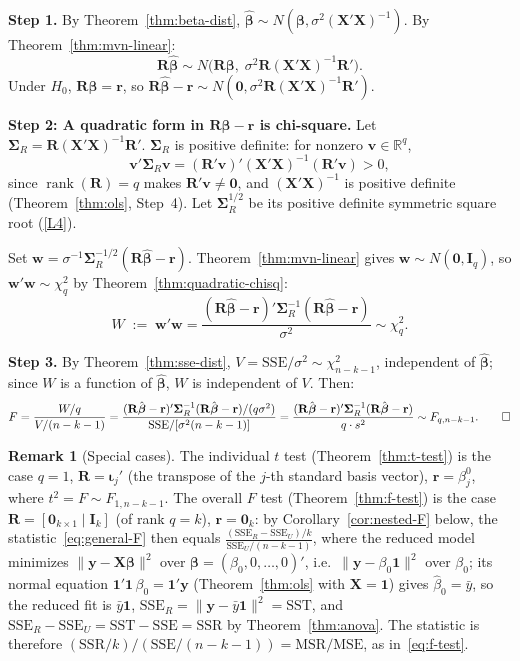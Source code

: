 \documentclass[12pt,a4paper]{article}
\makeatletter
\theoremstyle{definition}
\newtheorem{remark}[theorem]{Remark}
\renewenvironment{proof}[1][\proofname]{\par
  \pushQED{\qed}%
  \normalfont \topsep6\p@\@plus6\p@\relax
  \trivlist
  \item[\hskip\labelsep\bfseries #1\@addpunct{.}]\ignorespaces
}{%
  \popQED\endtrivlist\@endpefalse
}
\DeclareMathOperator\rank{rank}
\newcommand{\SST}{\mathrm{SST}}
\newcommand{\SSR}{\mathrm{SSR}}
\newcommand{\SSE}{\mathrm{SSE}}
\newcommand{\MSR}{\mathrm{MSR}}
\newcommand{\MSE}{\mathrm{MSE}}
\newcommand{\bX}{\mathbf{X}}
\newcommand{\by}{\mathbf{y}}
\def\bb{\boldsymbol{\beta}}
\newcommand{\bI}{\mathbf{I}}
\newcommand{\bR}{\mathbf{R}}
\newcommand{\br}{\mathbf{r}}
\newcommand{\bone}{\mathbf{1}}
\newcommand{\bzero}{\mathbf{0}}
\newcommand{\bw}{\mathbf{w}}
\newcommand{\bv}{\mathbf{v}}
\newcommand{\Real}{\mathbb{R}}
\makeatother
\begin{document}
\begin{proof}
\textbf{Step 1.} By Theorem~\ref{thm:beta-dist}, $\hat{\bb} \sim N(\bb, \sigma^2(\bX'\bX)^{-1})$. By Theorem~\ref{thm:mvn-linear}:
\[
\bR\hat{\bb} \sim N\!\bigl(\bR\bb,\; \sigma^2\bR(\bX'\bX)^{-1}\bR'\bigr).
\]
Under $H_0$, $\bR\bb = \br$, so $\bR\hat{\bb} - \br \sim N(\bzero, \sigma^2\bR(\bX'\bX)^{-1}\bR')$.

\textbf{Step 2: A quadratic form in $\bR\hat{\bb} - \br$ is chi-square.} Let $\boldsymbol\Sigma_R = \bR(\bX'\bX)^{-1}\bR'$. $\boldsymbol\Sigma_R$ is positive definite: for nonzero $\bv \in \Real^q$,
\[
\bv'\boldsymbol\Sigma_R\bv = (\bR'\bv)'(\bX'\bX)^{-1}(\bR'\bv) > 0,
\]
since $\rank(\bR) = q$ makes $\bR'\bv \neq \bzero$, and $(\bX'\bX)^{-1}$ is positive definite (Theorem~\ref{thm:ols}, Step~4). Let $\boldsymbol\Sigma_R^{1/2}$ be its positive definite symmetric square root (\ref{L4}).

Set $\bw = \sigma^{-1}\boldsymbol\Sigma_R^{-1/2}(\bR\hat{\bb} - \br)$. Theorem~\ref{thm:mvn-linear} gives $\bw \sim N(\bzero, \bI_q)$, so $\bw'\bw \sim \chi^2_q$ by Theorem~\ref{thm:quadratic-chisq}:
\[
W \;:=\; \bw'\bw = \frac{(\bR\hat{\bb} - \br)'\boldsymbol\Sigma_R^{-1}(\bR\hat{\bb} - \br)}{\sigma^2} \sim \chi^2_q.
\]

\textbf{Step 3.} By Theorem~\ref{thm:sse-dist}, $V = \SSE/\sigma^2 \sim \chi^2_{n-k-1}$, independent of $\hat{\bb}$; since $W$ is a function of $\hat{\bb}$, $W$ is independent of $V$. Then:
\[
F = \frac{W/q}{V/(n-k-1)} = \frac{(\bR\hat{\bb} - \br)'\boldsymbol\Sigma_R^{-1}(\bR\hat{\bb} - \br)/(q\sigma^2)}{\SSE/[\sigma^2(n-k-1)]} = \frac{(\bR\hat{\bb} - \br)'\boldsymbol\Sigma_R^{-1}(\bR\hat{\bb} - \br)}{q \cdot s^2} \sim F_{q, n-k-1}. \qedhere
\]
\end{proof}

\begin{remark}[Special cases]\label{rem:special-cases}
The individual $t$ test (Theorem~\ref{thm:t-test}) is the case $q = 1$, $\bR = \boldsymbol\iota_j'$ (the transpose of the $j$-th standard basis vector), $\br = \beta_j^0$, where $t^2 = F \sim F_{1, n-k-1}$. The overall $F$ test (Theorem~\ref{thm:f-test}) is the case $\bR = [\bzero_{k \times 1} \mid \bI_k]$ (of rank $q = k$), $\br = \bzero_k$: by Corollary~\ref{cor:nested-F} below, the statistic~\eqref{eq:general-F} then equals $\frac{(\SSE_R - \SSE_U)/k}{\SSE_U/(n-k-1)}$, where the reduced model minimizes $\|\by - \bX\bb\|^2$ over $\bb = (\beta_0, 0, \ldots, 0)'$, i.e.\ $\|\by - \beta_0\bone\|^2$ over $\beta_0$; its normal equation $\bone'\bone\,\beta_0 = \bone'\by$ (Theorem~\ref{thm:ols} with $\bX = \bone$) gives $\hat{\beta}_0 = \bar{y}$, so the reduced fit is $\bar{y}\bone$, $\SSE_R = \|\by - \bar{y}\bone\|^2 = \SST$, and $\SSE_R - \SSE_U = \SST - \SSE = \SSR$ by Theorem~\ref{thm:anova}. The statistic is therefore $(\SSR/k)/(\SSE/(n-k-1)) = \MSR/\MSE$, as in~\eqref{eq:f-test}.
\end{remark}
\end{document}
